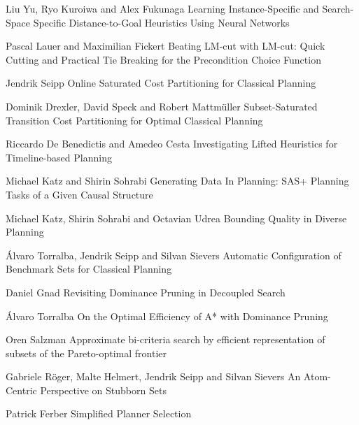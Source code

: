 {
Liu Yu, Ryo Kuroiwa and Alex Fukunaga
}
{
Learning Instance-Specific and Search-Space Specific Distance-to-Goal Heuristics
Using Neural Networks }

{
Pascal Lauer and Maximilian Fickert
}
{ Beating LM-cut with LM-cut: Quick Cutting and Practical Tie Breaking for the
Precondition Choice Function
}

{
Jendrik Seipp
}
{
Online Saturated Cost Partitioning for Classical Planning
}

{
Dominik Drexler, David Speck and Robert Mattmüller
}
{
Subset-Saturated Transition Cost Partitioning for Optimal Classical Planning
}

{
Riccardo De Benedictis and Amedeo Cesta
}
{
Investigating Lifted Heuristics for Timeline-based Planning
}

{
Michael Katz and Shirin Sohrabi
}
{
Generating Data In Planning: SAS+ Planning Tasks of a Given Causal Structure
}

{
Michael Katz, Shirin Sohrabi and Octavian Udrea
}
{
Bounding Quality in Diverse Planning
}

{
\'{A}lvaro Torralba, Jendrik Seipp and Silvan Sievers
}
{
Automatic Configuration of Benchmark Sets for Classical Planning
}


{
Daniel Gnad
}
{
Revisiting Dominance Pruning in Decoupled Search
}


{
\'{A}lvaro Torralba
}
{
On the Optimal Efficiency of A* with Dominance Pruning
}


{
Oren Salzman
}
{Approximate bi-criteria search by efficient representation of subsets of the
Pareto-optimal frontier }


{
Gabriele R\"{o}ger, Malte Helmert, Jendrik Seipp and Silvan Sievers
}
{
An Atom-Centric Perspective on Stubborn Sets
}

{
Patrick Ferber
}
{
Simplified Planner Selection
}
